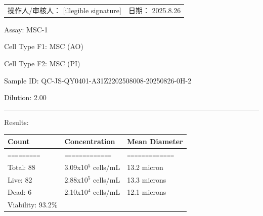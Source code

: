 \documentclass[UTF8,10pt,a4paper,fontset=fandol]{ctexart}
\renewcommand{\arraystretch}{1.15}
\newcommand{\fieldvalue}[1]{#1}
\newcommand{\handwritten}[1]{#1}
\begin{document}
\vfill

\noindent
\begin{tabular}{p{}p{}}
操作人/审核人：%
\fieldvalue{\handwritten{[illegible signature]}}
&
日期：%
\fieldvalue{\handwritten{2025.8.26}}
\end{tabular}

\newpage

\noindent
Assay:
\fieldvalue{MSC-1}

\vspace{0.5em}
\noindent
Cell Type F1:
\fieldvalue{MSC (AO)}

\noindent
Cell Type F2:
\fieldvalue{MSC (PI)}

\vspace{0.8em}
\noindent
Sample ID:
\fieldvalue{QC-JS-QY0401-A31Z2202508008-20250826-0H-2}

\noindent
Dilution:
\fieldvalue{2.00}

\vspace{0.8em}
\noindent\rule{\textwidth}{0.4pt}

\noindent
Results:

\vspace{0.5em}
\renewcommand{\arraystretch}{1.15}
\begin{tabularx}{\textwidth}{@{}X X X@{}}
\textbf{Count} & \textbf{Concentration} & \textbf{Mean Diameter} \\
\hline
\texttt{=========} & \texttt{=============} & \texttt{=============} \\[0.2em]
Total:
\fieldvalue{88}
&
\fieldvalue{3.09x10$^{5}$ cells/mL}
&
\fieldvalue{13.2 micron}
\\
Live:
\fieldvalue{82}
&
\fieldvalue{2.88x10$^{5}$ cells/mL}
&
\fieldvalue{13.3 microns}
\\
Dead:
\fieldvalue{6}
&
\fieldvalue{2.10x10$^{4}$ cells/mL}
&
\fieldvalue{12.1 microns}
\\
Viability:
\fieldvalue{93.2\%}
& &
\end{tabularx}
\end{document}
